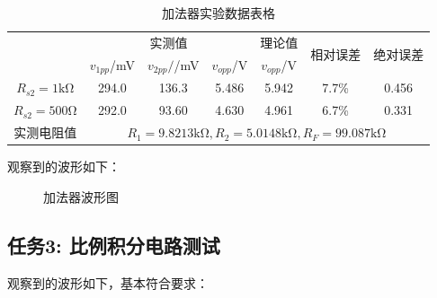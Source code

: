 \documentclass[a4paper,11pt,UTF8]{article}
\begin{document}
\begin{table}[htbp]
	\centering
	\caption{加法器实验数据表格}
	\label{label4}
	\begin{tabular}{|c|c|c|c|c|c|c|}
		\hline
		\multirow{2}{*}{}   & \multicolumn{3}{c|}{实测值} & 理论值 &
		\multirow{2}{*}{相对误差} &
		\multirow{2}{*}{绝对误差}\\
		\cline{2-5}
		\multirow{2}{*}{} & $v_{1pp}$/mV & $v_{2pp}/$/mV & $v_{opp}$/V & $v_{opp}$/V & 
		\multirow{2}{*}{} & 
		\multirow{2}{*}{} \\
		\hline
		$R_{s2}=1\mathrm{k\Omega}$ & 294.0 & 136.3 & 5.486 & 5.942 & 7.7\% & 0.456 \\
		\hline
		$R_{s2}=500\mathrm{\Omega}$ & 292.0 & 93.60 & 4.630 & 4.961 & 6.7\% & 0.331 \\
		\hline
		实测电阻值 & \multicolumn{6}{c|}{$R_1=9.8213\mathrm{k\Omega},R_2=5.0148\mathrm{k\Omega}, R_F=99.087\mathrm{k\Omega}$}\\
		\hline
	\end{tabular}
\end{table}

观察到的波形如下：

\begin{figure}[H]
	\centering
	\setcounter{subfigure}{0}
	\caption{加法器波形图}
\end{figure}

\subsection{任务3: 比例积分电路测试}
观察到的波形如下，基本符合要求：
\end{document}
